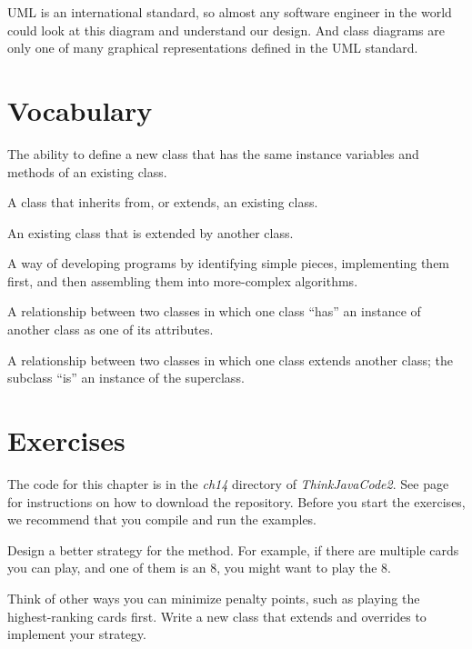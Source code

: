 UML is an international standard, so almost any software engineer in the world could look at this diagram and understand our design.
And class diagrams are only one of many graphical representations defined in the UML standard.


\section{Vocabulary}
\label{extending-classes_vocabulary}

\begin{description}

The ability to define a new class that has the same instance variables and methods of an existing class.

A class that inherits from, or extends, an existing class.

An existing class that is extended by another class.


A way of developing programs by identifying simple pieces, implementing them first, and then assembling them into more-complex algorithms.

A relationship between two classes in which one class ``has'' an instance of another class as one of its attributes.

A relationship between two classes in which one class extends another class; the subclass ``is'' an instance of the superclass.

\end{description}


\section{Exercises}
\label{extending-classes_exercises}

The code for this chapter is in the {\it ch14} directory of {\it ThinkJavaCode2}.
See page~\pageref{code} for instructions on how to download the repository.
Before you start the exercises, we recommend that you compile and run the examples.


\begin{exercise}  %

Design a better strategy for the  method.
For example, if there are multiple cards you can play, and one of them is an 8, you might want to play the 8.


Think of other ways you can minimize penalty points, such as playing the highest-ranking cards first.
Write a new class that extends  and overrides  to implement your strategy.

\end{exercise}


